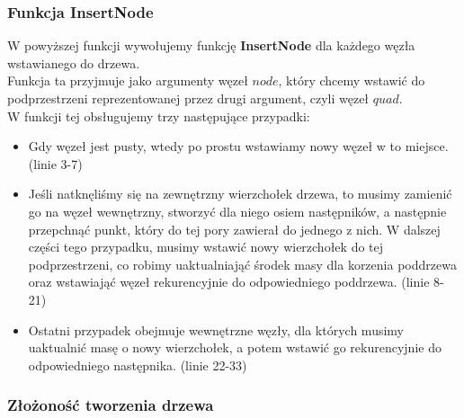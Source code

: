 \documentclass[14pt,twoside,a4paper]{article}
\theoremstyle{definition}
\begin{document}
\bigskip

\subsubsection{\large Funkcja InsertNode}

W powyższej funkcji wywołujemy funkcję \textbf{InsertNode} dla każdego węzła wstawianego do drzewa. \\
\bigskip
Funkcja ta przyjmuje jako argumenty węzeł $node$, który chcemy wstawić do podprzestrzeni reprezentowanej przez drugi argument, czyli węzeł $quad$.\\ W funkcji tej obsługujemy trzy następujące przypadki:
\begin{itemize}
\item Gdy węzeł jest pusty, wtedy po prostu wstawiamy nowy węzeł w to miejsce. (linie 3-7)
\item Jeśli natknęliśmy się na zewnętrzny wierzchołek drzewa, to musimy zamienić go na węzeł wewnętrzny, stworzyć dla niego osiem następników, a następnie przepchnąć punkt, który do tej pory zawierał do jednego z nich. W dalszej części tego przypadku, musimy wstawić nowy wierzchołek do tej podprzestrzeni, co robimy uaktualniająć środek masy dla korzenia poddrzewa oraz wstawiająć węzeł rekurencyjnie do odpowiedniego poddrzewa. (linie 8-21)
\item Ostatni przypadek obejmuje wewnętrzne węzły, dla których musimy uaktualnić masę o nowy wierzchołek, a potem wstawić go rekurencyjnie do odpowiedniego następnika. (linie 22-33)
\end{itemize}

\subsubsection{\large Złożoność tworzenia drzewa}
\end{document}
